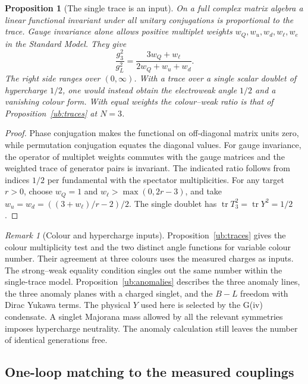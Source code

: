 \documentclass[aps,pra,onecolumn,superscriptaddress,nofootinbib,10pt]{revtex4-2}
\newtheorem{proposition}[theorem]{Proposition}
\theoremstyle{definition}
\theoremstyle{remark}
\newtheorem{remark}[theorem]{Remark}
\begin{document}
\begin{proposition}[The single trace is an input]\label{cr:weights}
On a full complex matrix algebra a linear functional invariant
under all unitary conjugations is proportional to the trace.
Gauge invariance alone allows positive multiplet weights
$w_Q,w_u,w_d,w_\ell,w_e$ in the Standard Model. They give
\[
 \frac{g_3^2}{g_L^2}
 =\frac{3w_Q+w_\ell}{2w_Q+w_u+w_d}.
\]
The right side ranges over $(0,\infty)$. With a trace over a
single scalar doublet of hypercharge $1/2$, one would instead
obtain the electroweak angle $1/2$ and a vanishing colour form.  With equal weights the colour--weak ratio is that
of Proposition~\ref{ub:traces} at $N=3$.
\end{proposition}
\begin{proof}
Phase conjugation makes the functional on off-diagonal matrix
units zero, while permutation conjugation equates the diagonal
values. For gauge invariance, the operator of multiplet weights
commutes with the gauge matrices and the weighted trace of
generator pairs is invariant. The indicated ratio follows from
indices $1/2$ per fundamental with the spectator multiplicities.
For any target $r>0$, choose $w_Q=1$ and
$w_\ell>\max(0,2r-3)$, and take
$w_u=w_d=((3+w_\ell)/r-2)/2$. The single doublet has
$\operatorname{tr}T_3^2=\operatorname{tr}Y^2=1/2$.
\end{proof}

\begin{remark}[Colour and hypercharge inputs]\label{cr:colourinput}
Proposition~\ref{ub:traces} gives the colour multiplicity test
and the two distinct angle functions for variable colour number.
Their agreement at three colours uses the measured charges as
inputs. The strong--weak equality condition singles out the same
number within the single-trace model. Proposition~\ref{ub:anomalies}
describes the three anomaly lines, the three anomaly planes with a
charged singlet, and the $B-L$ freedom with Dirac Yukawa terms.
The physical $Y$ used here is selected by the G(iv) condensate.
A singlet Majorana mass allowed by all the relevant symmetries
imposes hypercharge neutrality. The anomaly calculation still
leaves the number of identical generations free.
\end{remark}

\subsection{One-loop matching to the measured couplings}
\end{document}
